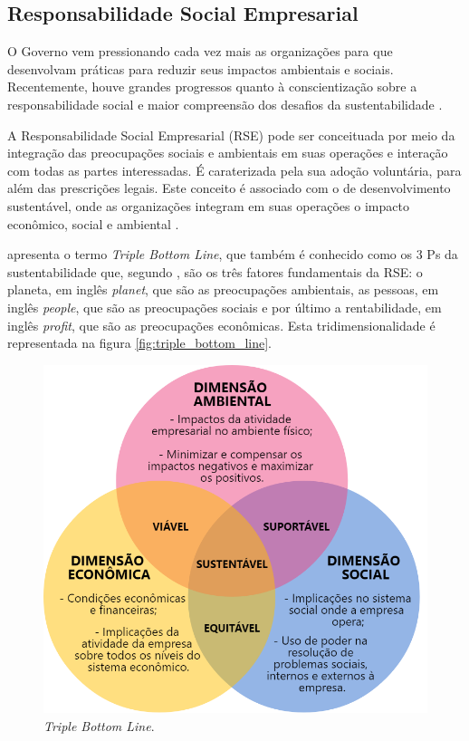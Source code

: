 \subsection{Responsabilidade Social Empresarial}

O Governo vem pressionando cada vez mais as organizações para que desenvolvam práticas para reduzir seus impactos ambientais e sociais. Recentemente, houve grandes progressos quanto à conscientização sobre a responsabilidade social e maior compreensão dos desafios da sustentabilidade \cite{kraemer2005responsabilidade}.

A Responsabilidade Social Empresarial (RSE) pode ser conceituada por meio da integração das preocupações sociais e ambientais em suas operações e interação com todas as partes interessadas. É caraterizada pela sua adoção voluntária, para além das prescrições legais. Este conceito é associado com o de desenvolvimento sustentável, onde as organizações integram em suas operações o impacto econômico, social e ambiental \cite{biorumo}.  

 apresenta o termo \textit{Triple Bottom Line}, que também é conhecido como os 3 Ps da sustentabilidade que, segundo , são os três fatores fundamentais da RSE:  o planeta, em inglês \textit{planet}, que são as preocupações ambientais, as pessoas, em inglês \textit{people}, que são as preocupações sociais e por último a rentabilidade, em inglês \textit{profit}, que são as preocupações econômicas. Esta tridimensionalidade é representada na figura \autoref{fig:triple_bottom_line}.


\begin{figure}[htb]
    \caption{\label{fig:triple_bottom_line}\textit{Triple Bottom Line}.}
    \begin{center}
        \includegraphics[scale=0.4]{imagens/triple-bottom-line.png}
    \end{center}
\end{figure}

